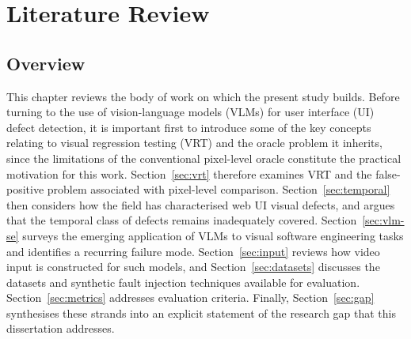 %
%
%

\chapter{Literature Review}
\label{ch:litreview}

\section{Overview}
\label{sec:lit-overview}

This chapter reviews the body of work on which the present study builds.
Before turning to the use of vision-language models (VLMs) for user
interface (UI) defect detection, it is important first to introduce some
of the key concepts relating to visual regression testing (VRT) and the
oracle problem it inherits, since the limitations of the conventional
pixel-level oracle constitute the practical motivation for this work.
Section~\ref{sec:vrt} therefore examines VRT and the false-positive
problem associated with pixel-level comparison. Section~\ref{sec:temporal}
then considers how the field has characterised web UI visual defects, and
argues that the temporal class of defects remains inadequately covered.
Section~\ref{sec:vlm-se} surveys the emerging application of VLMs to
visual software engineering tasks and identifies a recurring failure mode.
Section~\ref{sec:input} reviews how video input is constructed for such
models, and Section~\ref{sec:datasets} discusses the datasets and
synthetic fault injection techniques available for evaluation.
Section~\ref{sec:metrics} addresses evaluation criteria. Finally,
Section~\ref{sec:gap} synthesises these strands into an explicit statement
of the research gap that this dissertation addresses.


